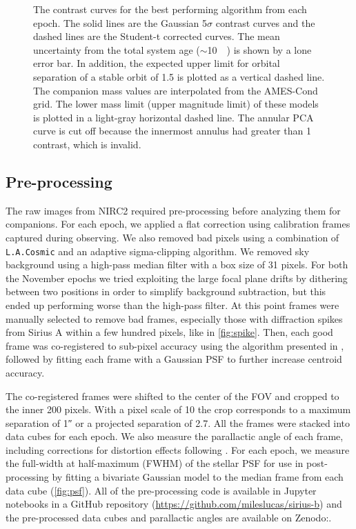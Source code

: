 \documentclass[twocolumn,linenumbers]{aastex631}
\begin{document}
\begin{figure*}
    \centering
    \caption{The contrast curves for the best performing algorithm from each epoch. The solid lines are the Gaussian 5$\sigma$ contrast curves and the dashed lines are the Student-t corrected curves. The mean uncertainty from the total system age ($\sim$\qty{10}{\mega\year}) is shown by a lone error bar. In addition, the expected upper limit for orbital separation of a stable orbit of \qty{1.5}{\au} is plotted as a vertical dashed line. The companion mass values are interpolated from the AMES-Cond grid. The lower mass limit (upper magnitude limit) of these models is plotted in a light-gray horizontal dashed line. The annular PCA curve is cut off because the innermost annulus had greater than 1 contrast, which is invalid.}
    \label{fig:contrast}
\end{figure*}

\subsection{Pre-processing}

The raw images from NIRC2 required pre-processing before analyzing them for companions. For each epoch, we applied a flat correction using calibration frames captured during observing. We also removed bad pixels using a combination of \texttt{L.A.Cosmic} \citep{van_dokkum_cosmic-ray_2001} and an adaptive sigma-clipping algorithm. We removed sky background using a high-pass median filter with a box size of 31 pixels. For both the November epochs we tried exploiting the large focal plane drifts by dithering between two positions in order to simplify background subtraction, but this ended up performing worse than the high-pass filter. At this point frames were manually selected to remove bad frames, especially those with diffraction spikes from Sirius A within a few hundred pixels, like in \cref{fig:spike}. Then, each good frame was co-registered to sub-pixel accuracy using the algorithm presented in \citet{guizar-sicairos_efficient_2008}, followed by fitting each frame with a Gaussian PSF to further increase centroid accuracy.

The co-registered frames were shifted to the center of the FOV and cropped to the inner 200 pixels. With a pixel scale of \qty{10}{\milliarcsecond} the crop corresponds to a maximum separation of \ang{;;1} or a projected separation of \qty{2.7}{\au}. All the frames were stacked into data cubes for each epoch. We also measure the parallactic angle of each frame, including corrections for distortion effects following \citet{yelda_improving_2010}. For each epoch, we measure the full-width at half-maximum (FWHM) of the stellar PSF for use in post-processing by fitting a bivariate Gaussian model to the median frame from each data cube (\cref{fig:psf}). All of the pre-processing code is available in Jupyter notebooks in a GitHub repository (\href{https://github.com/mileslucas/sirius-b}{https://github.com/mileslucas/sirius-b}) and the pre-processed data cubes and parallactic angles are available on Zenodo:.
\end{document}
